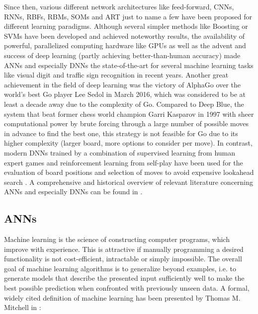 Since then, various different network architectures like feed-forward, \acp{CNN}, \acp{RNN}, \acp{RBF}, \acp{RBM}, \acp{SOM} and \ac{ART} just to name a few \cite{Schmidhuber2015} have been proposed for different learning paradigms.
Although several simpler methods like Boosting \cite{Freund1997} or \acp{SVM} \cite{Vapnik1995} have been developed and achieved noteworthy results, the availability of powerful, parallelized computing hardware like \acp{GPU} as well as the advent and success  of deep learning (partly achieving better-than-human accuracy) made \acp{ANN} \cite{Rojas1996} and especially \acp{DNN} \cite{LeCun2015} the state-of-the-art for several machine learning tasks like visual digit \cite{Ciresan2012a} and traffic sign \cite{Ciresan2012} recognition in recent years.
Another great achievement in the field of deep learning was the victory of AlphaGo \cite{Silver2016} over the world's best Go player Lee Sedol in March 2016, which was considered to be at least a decade away due to the complexity of Go.
Compared to Deep Blue, the system that beat former chess world champion Garri Kasparov in 1997 \cite{Hsu2002} with sheer computational power by brute forcing through a large number of possible moves in advance to find the best one, this strategy is not feasible for Go due to its higher complexity (larger board, more options to consider per move).
In contrast, modern \acp{DNN} trained by a combination of supervised learning from human expert games and reinforcement learning from self-play have been used for the evaluation of board positions and selection of moves to avoid expensive lookahead search \cite{Silver2016}.
A comprehensive and historical overview of relevant literature concerning \acp{ANN} and especially \acp{DNN} can be found in \cite{Schmidhuber2015, LeCun2015}.

\subsection{\aclp{ANN}}
\label{subsec:ML_ANN}
Machine learning is the science of constructing computer programs, which improve with experience. 
This is attractive if manually programming a desired functionality is not cost-efficient, intractable or simply impossible.  
The overall goal of machine learning algorithms is to generalize beyond examples, i.e. to generate models that describe the presented input sufficiently well to make the best possible prediction when confronted with previously unseen data.
A formal, widely cited definition of machine learning has been presented by Thomas M. Mitchell in \cite{Mitchell1997}:

